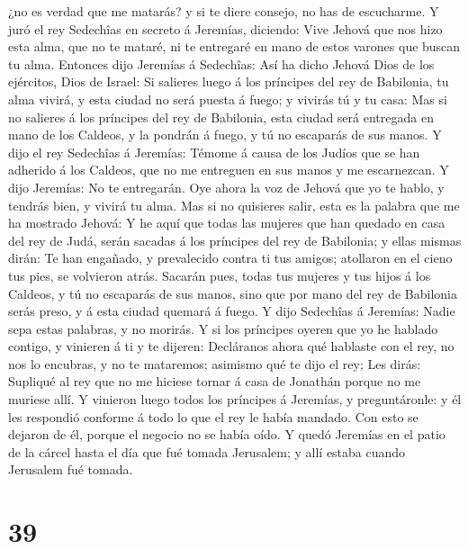 ¿no es verdad que me matarás? y si te diere consejo, no has de
escucharme.  Y juró el rey Sedechîas en secreto á
Jeremías, diciendo: Vive Jehová que nos hizo esta alma, que no te
mataré, ni te entregaré en mano de estos varones que buscan tu alma.
 Entonces dijo Jeremías á Sedechîas: Así ha dicho Jehová
Dios de los ejércitos, Dios de Israel: Si salieres luego á los príncipes
del rey de Babilonia, tu alma vivirá, y esta ciudad no será puesta á
fuego; y vivirás tú y tu casa:  Mas si no salieres á los
príncipes del rey de Babilonia, esta ciudad será entregada en mano de
los Caldeos, y la pondrán á fuego, y tú no escaparás de sus manos.
 Y dijo el rey Sedechîas á Jeremías: Témome á causa de
los Judíos que se han adherido á los Caldeos, que no me entreguen en sus
manos y me escarnezcan.  Y dijo Jeremías: No te
entregarán. Oye ahora la voz de Jehová que yo te hablo, y tendrás bien,
y vivirá tu alma.  Mas si no quisieres salir, esta es la
palabra que me ha mostrado Jehová:  Y he aquí que todas
las mujeres que han quedado en casa del rey de Judá, serán sacadas á los
príncipes del rey de Babilonia; y ellas mismas dirán: Te han engañado, y
prevalecido contra ti tus amigos; atollaron en el cieno tus pies, se
volvieron atrás.  Sacarán pues, todas tus mujeres y tus
hijos á los Caldeos, y tú no escaparás de sus manos, sino que por mano
del rey de Babilonia serás preso, y á esta ciudad quemará á fuego.
 Y dijo Sedechîas á Jeremías: Nadie sepa estas palabras,
y no morirás.  Y si los príncipes oyeren que yo he
hablado contigo, y vinieren á ti y te dijeren: Decláranos ahora qué
hablaste con el rey, no nos lo encubras, y no te mataremos; asimismo qué
te dijo el rey;  Les dirás: Supliqué al rey que no me
hiciese tornar á casa de Jonathán porque no me muriese allí.
 Y vinieron luego todos los príncipes á Jeremías, y
preguntáronle: y él les respondió conforme á todo lo que el rey le había
mandado. Con esto se dejaron de él, porque el negocio no se había oído.
 Y quedó Jeremías en el patio de la cárcel hasta el día
que fué tomada Jerusalem; y allí estaba cuando Jerusalem fué tomada.

\hypertarget{section-38}{%
\section{39}\label{section-38}}


